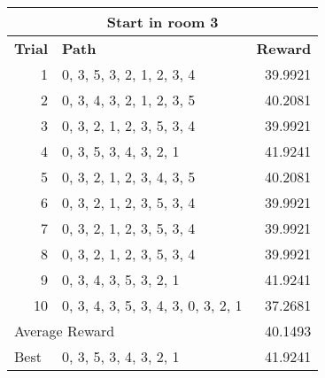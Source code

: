 \documentclass[../Head/Main.tex]{subfiles}
\begin{document}
\begin{tabular}{r l r}
	\hline
	\multicolumn{3}{c}{\textbf{\large Start in room 3}} \\
	\hline 
	\multicolumn{1}{l}{\textbf{Trial}} & \textbf{Path} & \textbf{Reward} \\ 			\hline
	1  & 0, 3, 5, 3, 2, 1, 2, 3, 4           & 39.9921\\
	2  & 0, 3, 4, 3, 2, 1, 2, 3, 5           & 40.2081\\
	3  & 0, 3, 2, 1, 2, 3, 5, 3, 4           & 39.9921\\
	4  & 0, 3, 5, 3, 4, 3, 2, 1              & 41.9241\\
	5  & 0, 3, 2, 1, 2, 3, 4, 3, 5           & 40.2081\\
	6  & 0, 3, 2, 1, 2, 3, 5, 3, 4           & 39.9921\\
	7  & 0, 3, 2, 1, 2, 3, 5, 3, 4           & 39.9921\\
	8  & 0, 3, 2, 1, 2, 3, 5, 3, 4           & 39.9921\\
	9  & 0, 3, 4, 3, 5, 3, 2, 1              & 41.9241\\
	10 & 0, 3, 4, 3, 5, 3, 4, 3, 0, 3, 2, 1  & 37.2681\\
	\hline
	\multicolumn{2}{l}{Average Reward} & 40.1493 \\
	\hline	
	\multicolumn{1}{l}{Best} & 0, 3, 5, 3, 4, 3, 2, 1  & 41.9241\\
	\hline
\end{tabular}
\end{document}
